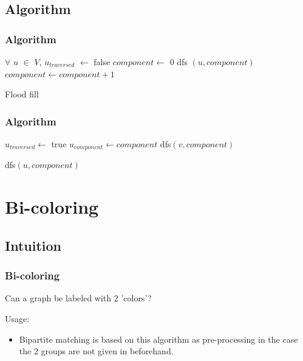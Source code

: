 \documentclass[article]{beamer}
\begin{document}
\subsection{Algorithm}
\begin{frame}
	\frametitle{Algorithm}
	
		\begin{algorithm}[H]
		\begin{algorithmic}[1]
		\STATE $\forall$ $u$ $\in$ $V$, $u_{traversed}$ $\gets$ false		
		\STATE $component \gets$ 0		
		\STATE dfs $(u, component)$
		\STATE $component \gets component + 1$
		\ENDIF
		\ENDFOR		
		
		\end{algorithmic}
		\caption{Flood fill}
		\label{alg:seq}
		\end{algorithm}	
	
\end{frame}


\begin{frame}
	\frametitle{Algorithm}
	
		\begin{algorithm}[H]
		\begin{algorithmic}[1]
		\STATE $u_{traversed} \gets$ true
		\STATE $u_{component} \gets component$			
		\STATE dfs$(v, component)$
		\ENDIF
		\ENDFOR
		
		\end{algorithmic}
		\caption{dfs$(u, component)$}
		\label{alg:seq}
		\end{algorithm}	
	
\end{frame}

\section{Bi-coloring}
\subsection{Intuition}
\begin{frame}
	\frametitle{Bi-coloring}
	Can a graph be labeled with 2 'colors'?
	
	\vspace{5mm}
	
	Usage:
	\begin{itemize}
		\item Bipartite matching is based on this algorithm as pre-processing in the case the 2 groups are not given in beforehand.
	\end{itemize}
\end{frame}
\end{document}
